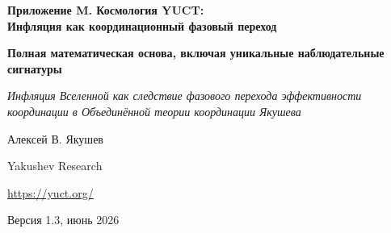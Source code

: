 \documentclass[12pt,a4paper]{article}
\theoremstyle{remark}
\newcommand{\Keff}{K_{\mathrm{eff}}}
\begin{document}
	
	\begin{titlepage}
		\centering
		\vspace*{2cm}
		
		{\Huge\bfseries Приложение M. Космология YUCT: \\ Инфляция как координационный фазовый переход\par}
		\vspace{0.5cm}
		{\Large\bfseries Полная математическая основа, включая уникальные наблюдательные сигнатуры\par}
		\vspace{0.3cm}
		{\large\textit{Инфляция Вселенной как следствие фазового перехода эффективности координации в Объединённой теории координации Якушева}\par}
		
		\vspace{1.5cm}
		
		{\large Алексей В. Якушев\par}
		\vspace{0.3cm}
		{\normalsize Yakushev Research\par}
		\vspace{0.2cm}
		{\normalsize \url{https://yuct.org/}\par}
		
		\vspace{1.0cm}
		{\normalsize Версия 1.3, июнь 2026\par}
		
		\vfill
		\newpage
		\begin{abstract}
			\noindent
			В этом приложении представлено полное математическое описание инфляционной стадии эволюции Вселенной как фазового перехода эффективности координации $\Keff$ в рамках Объединённой теории координации Якушева (YUCT). Показано, что в ранней Вселенной, где $\Keff \ll 1$, координационное поле $\Psi_{MN}$ находится в симметричной фазе. При охлаждении происходит фазовый переход, сопровождающийся резким возрастанием $\Keff$ до значений $\Keff \gg 1$, что порождает экспоненциальное расширение (инфляцию) без введения фундаментального скалярного поля (инфлатона). Эффективный потенциал выводится из 19-мерного лагранжиана YUCT и наследует фрактальную структуру словарей. Универсальный показатель масштабирования ошибок $\beta = 0.67$ (Приложение L) играет ключевую роль в определении инфляционных параметров. Получены выражения для скалярного спектрального индекса $n_s$ и тензорно-скалярного отношения $r$, которые согласуются с данными Planck и дают конкретные предсказания для будущих экспериментов (CMB‑S4, LiteBIRD, Euclid). После инфляции конденсат координационного поля распадается на частицы, заполняя Вселенную материей; эффективность этого процесса также зависит от $\beta$, связывая нуклеосинтез с той же фрактальной размерностью. Кроме того, мы идентифицируем уникальные наблюдательные сигнатуры YUCT-инфляции, отличающие её от других моделей: фиксированную локальную негауссовость $f_{\text{NL}}^{\text{local}} \approx 1.12$, специфическое соотношение между $f_{\text{NL}}$ и $r$, характерные формы биспектра и возможные осцилляции в тензорном спектре мощности. Предложены экспериментальные протоколы для проверки координационной природы инфляции.
		\end{abstract}
		

\end{titlepage}
\end{document}
